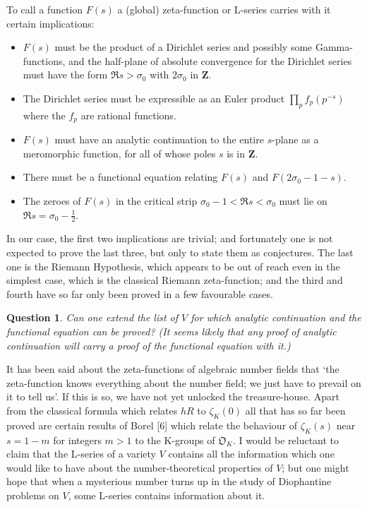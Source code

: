 \documentclass[12pt]{article}
\def\bZ{{\mathbf Z}}
\def\fO{{\mathfrak O}}
\def\fR{{\mathfrak R}}
\def\gs{{\sigma}}
\def\bpr{\begin{question} \label}
\def\epr{\end{question}}
\newtheorem{question}{Question}
\def\half{{\textstyle{\frac{1}{2}}}}
\begin{document}
To call a function $F(s)$ a (global) zeta-function or L-series carries
with it certain implications:
\begin{itemize}
\item $F(s)$ must be the product of a Dirichlet series and possibly some
Gamma-functions, and the half-plane of absolute convergence for the Dirichlet
series must have the form $\fR s>\gs_0$ with $2\gs_0$ in $\bZ$.
\item The Dirichlet series must be expressible as an Euler product $\prod_p
f_p(p^{-s})$ where the $f_p$ are rational functions.
\item $F(s)$ must have an analytic continuation to the entire $s$-plane as a
meromorphic function, for all of whose poles $s$ is in $\bZ$.
\item There must be a functional equation relating $F(s)$ and $F(2\gs_0-1-s)$.
\item The zeroes of $F(s)$ in the critical strip $\gs_0-1<\fR s<\gs_0$ must
lie on $\fR s=\gs_0-\half$.
\end{itemize}
In our case, the first two implications are trivial; and fortunately one is
not expected to prove the last three, but only to state them as conjectures.
The last one is the Riemann Hypothesis, which appears to be out of reach even
in the simplest case, which is the classical
Riemann zeta-function; and the third and
fourth have so far only been proved in a few favourable cases.
\bpr{Q6} Can one extend the list of $V$ for which analytic continuation and
the functional equation can be proved? (It seems likely that any proof of
analytic continuation will carry a proof of the functional equation with it.)
\epr

It has been said about the zeta-functions of algebraic number fields that
`the zeta-function knows everything about the number field; we just have to
prevail on it to tell us'. If this is so, we have not yet unlocked the
treasure-house. Apart from the classical formula which relates $hR$ to
$\zeta_K(0)$ all that has so far been proved are certain results of Borel [6]
which
relate the behaviour of $\zeta_K(s)$ near $s=1-m$ for integers $m>1$
to the K-groups of $\fO_K$.
I would be reluctant to claim that the L-series of a variety $V$ contains all
the information which one would like to have about the number-theoretical
properties of
$V$; but one might hope that when a mysterious number turns up in
the study of Diophantine problems on $V$, some L-series contains information
about it.
\end{document}
